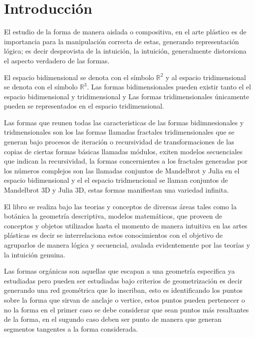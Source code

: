 \documentclass[16pt,]{krantz}
\theoremstyle{definition}
\theoremstyle{definition}
\theoremstyle{definition}
\theoremstyle{definition}
\theoremstyle{remark}
\begin{document}
\hypertarget{introducciuxf3n}{%
\chapter*{Introducción}\label{introducciuxf3n}}


El estudio de la forma de manera aislada o compositiva, en el arte plástico es de importancia para la manipulación correcta de estas, generando representación lógica; es decir desprovista de la intuición, la intuición, generalmente distorsiona el aspecto verdadero de las formas.

El espacio bidimensional se denota con el símbolo \(\mathbb{R}^2\) y al espacio tridimensional se denota con el símbolo \(\mathbb{R}^3\). Las formas bidimensionales pueden existir tanto el el espacio bidimensional y tridimensional y Las formas tridimensionales únicamente pueden se representados en el espacio tridimensional.

Las formas que reunen todas las caracteristicas de las formas bidimnesionales y tridmensionales son los las formas llamadas fractales tridimensionales que se generan bajo procesos de iteración o recursividad de transformaciones de las copias de ciertas formas básicas llamadas módulos, exiten modelos secuenciales que indican la recursividad, la formas concernientes a los fractales generadas por los números complejos son las llamadas conjuntos de Mandelbrot y Julia en el espacio bidimensional y el el espacio tridmencional se llaman conjuntos de Mandelbrot 3D y Julia 3D, estas formas manifiestan una variedad infinita.

El libro se realiza bajo las teorias y conceptos de diversas áreas tales como la botánica la geometría descriptiva, modelos matemáticos, que proveen de conceptos y objetos utilizados hasta el momento de manera intuitiva en las artes plásticas es decir se interrelaciona estos conocimientos con el objetivo de agruparlos de manera lógica y secuencial, avalada evidentemente por las teorías y la intuición genuina.

Las formas orgánicas son aquellas que escapan a una geometría especifica ya estudiadas pero pueden ser estudiadas bajo criterios de geometrización es decir generando una red geométrica que lo inscriban, esto es identificando los puntos sobre la forma que sirvan de anclaje o vertice, estos puntos pueden pertenecer o no la forma en el primer caso se debe considerar que sean puntos más resaltantes de la forma, en el sugundo caso deben ser punto de manera que generan segmentos tangentes a la forma considerada.
\end{document}
